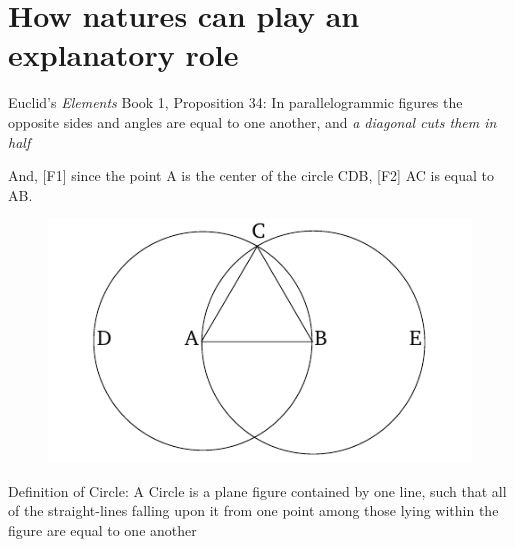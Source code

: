 \documentclass[11pt]{article}
\begin{document}
\section*{How natures can play an explanatory role}

\noindent Euclid's \emph{Elements} Book 1, Proposition 34: In parallelogrammic figures the opposite sides and angles are equal to one another, and \emph{a diagonal cuts them in half}
\vspace*{2mm}

\noindent And, [F1] since the point A is the center of the circle CDB, [F2] AC is equal to AB.

\begin{figure}[h!]
\centering
\includegraphics[scale=0.7]{circle}
\end{figure}

\noindent Definition of Circle: A Circle is a plane figure contained by one line, such that all of the straight-lines falling upon it from one point among those lying within the figure are equal to one another
\end{document}
